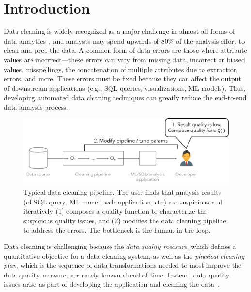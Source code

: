 \section{Introduction}\label{intro}\sloppy


Data cleaning is widely recognized as a major challenge in almost all forms of data analytics~\cite{nytimes}, and analysts may spend upwards of 80\% of the analysis effort to clean and prep the data.  A common form of data errors are those where attribute values are incorrect---these errors can vary from missing data, incorrect or biased values, misspellings, the concatenation of multiple attributes due to extraction errors, and more.  These errors must be fixed because they can affect the output of downstream applications (e.g., SQL queries, visualizations, ML models).  Thus, developing automated data cleaning techniques can greatly reduce the end-to-end data analysis process.

\begin{figure}[t]
  \centering
 \includegraphics[width=\columnwidth]{figures/user-pipeline}
 \caption{\small Typical data cleaning pipeline.  The user finds that analysis results (of SQL query, ML model, web application, etc) are suspicious and iteratively (1) composes a quality function to characterize the suspicious quality issues, and (2) modifies the data cleaning pipeline to address the errors.  The bottleneck is the human-in-the-loop.  \label{fig:user-pipeline}}
\end{figure}

Data cleaning is challenging because the {\it data quality measure}, which defines a quantitative objective for a data cleaning system, as well as the {\it physical cleaning plan}, which is the sequence of data transformations needed to most improve the data quality measure, are rarely known ahead of time. Instead, data quality issues arise as part of developing the application and cleaning the data~\cite{krishnan2016hilda}.  


